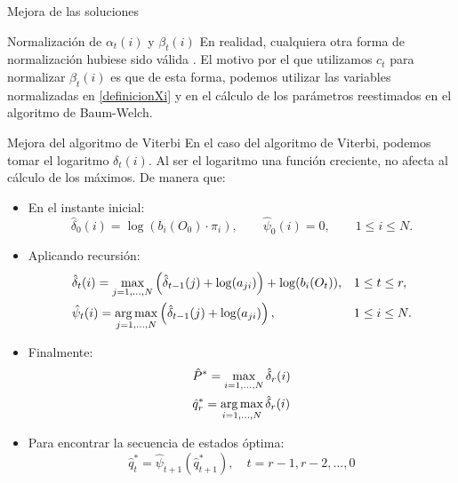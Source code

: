 \begin{section}{Mejora de las soluciones}
\begin{subsection}{Normalización de $\alpha_t(i)$ y $\beta_t(i)$}
En realidad, cualquiera otra forma de normalización hubiese sido válida \cite{DEVIJVER1985369}. El motivo por el que utilizamos $c_t$ para normalizar $\beta_t(i)$ es que de esta forma, podemos utilizar las variables normalizadas en \eqref{definicionXi} y en el cálculo de los parámetros reestimados en el algoritmo de Baum-Welch. 
\end{subsection}
\begin{subsection}{Mejora del algoritmo de Viterbi}
En el caso del algoritmo de Viterbi, podemos tomar el logaritmo $\delta_t(i)$. Al ser el logaritmo una función creciente, no afecta al cálculo de los máximos. De manera que:
\begin{itemize}
    \item En el instante inicial:
    \begin{equation*}
        \hat{\delta}_0(i)=\log(b_i(O_0)\cdot\pi_i), \qquad \hat{\psi}_0(i)=0, \qquad 1\leq i\leq N.
    \end{equation*}
    \item Aplicando recursión:
    \begin{align*}
        &\hat{\delta}_t(i)=\max_{j=1,\dots,N}\left( \hat{\delta}_{t-1}(j)+\log(a_{ji}) \right)+\log(b_i(O_t)), && 1\leq t\leq r, \\
        &\hat{\psi}_t(i)=\operatorname*{\arg\max}_{j=1,\dots,N}\left(\hat{\delta}_{t-1}(j)+\log(a_{ji})\right),  &&  1\leq i\leq N.
    \end{align*}
    \item Finalmente:
    \begin{align*}
        & \hat{P}^*=\max_{i=1,\dots,N} \hat{\delta}_r(i)\\
        & \hat{q}_r^*=\operatorname*{\arg\max}_{i=1,\dots,N} \hat{\delta}_r(i)
    \end{align*}
    \item Para encontrar la secuencia de estados óptima:
    \[\hat{q}_t^*=\hat{\psi}_{t+1}(\hat{q}_{t+1}^*), \quad t=r-1,r-2,\dots,0\]
\end{itemize}
\end{subsection}

\end{section}